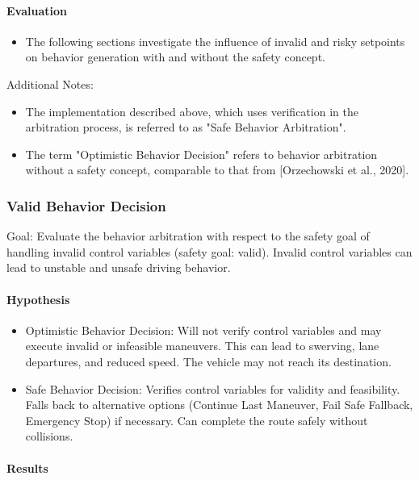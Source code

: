 \paragraph*{Evaluation}

\begin{itemize}
    \item The following sections investigate the influence of invalid and risky setpoints on behavior generation with and without the safety concept.
\end{itemize}

Additional Notes:

\begin{itemize}
    \item The implementation described above, which uses verification in the arbitration process, is referred to as "Safe Behavior Arbitration".
    \item The term "Optimistic Behavior Decision" refers to behavior arbitration without a safety concept, comparable to that from [Orzechowski et al., 2020].
\end{itemize}

\subsubsection*{Valid Behavior Decision}
Goal: Evaluate the behavior arbitration with respect to the safety goal of handling invalid control variables (safety goal: valid).
Invalid control variables can lead to unstable and unsafe driving behavior.

\paragraph*{Hypothesis}
\begin{itemize}
    \item Optimistic Behavior Decision: Will not verify control variables and may execute invalid or infeasible maneuvers.
          This can lead to swerving, lane departures, and reduced speed.
          The vehicle may not reach its destination.
    \item Safe Behavior Decision:
          Verifies control variables for validity and feasibility.
          Falls back to alternative options (Continue Last Maneuver, Fail Safe Fallback, Emergency Stop) if necessary.
          Can complete the route safely without collisions.
\end{itemize}

\paragraph*{Results}

